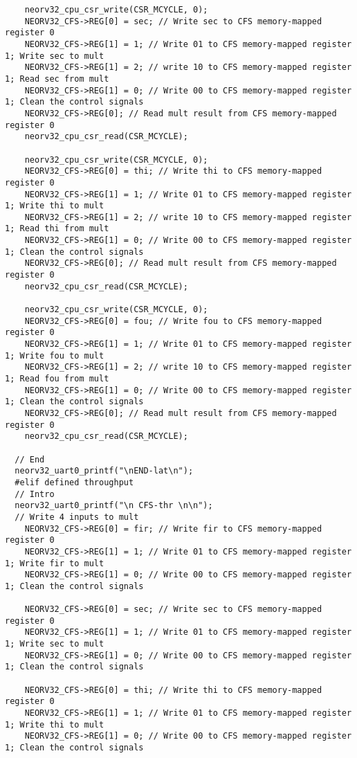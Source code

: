 \begin{code}
\begin{verbatim}
    neorv32_cpu_csr_write(CSR_MCYCLE, 0);
    NEORV32_CFS->REG[0] = sec; // Write sec to CFS memory-mapped register 0
    NEORV32_CFS->REG[1] = 1; // Write 01 to CFS memory-mapped register 1; Write sec to mult
    NEORV32_CFS->REG[1] = 2; // write 10 to CFS memory-mapped register 1; Read sec from mult
    NEORV32_CFS->REG[1] = 0; // Write 00 to CFS memory-mapped register 1; Clean the control signals
    NEORV32_CFS->REG[0]; // Read mult result from CFS memory-mapped register 0  
    neorv32_cpu_csr_read(CSR_MCYCLE); 

    neorv32_cpu_csr_write(CSR_MCYCLE, 0);
    NEORV32_CFS->REG[0] = thi; // Write thi to CFS memory-mapped register 0
    NEORV32_CFS->REG[1] = 1; // Write 01 to CFS memory-mapped register 1; Write thi to mult
    NEORV32_CFS->REG[1] = 2; // write 10 to CFS memory-mapped register 1; Read thi from mult
    NEORV32_CFS->REG[1] = 0; // Write 00 to CFS memory-mapped register 1; Clean the control signals
    NEORV32_CFS->REG[0]; // Read mult result from CFS memory-mapped register 0  
    neorv32_cpu_csr_read(CSR_MCYCLE); 

    neorv32_cpu_csr_write(CSR_MCYCLE, 0);
    NEORV32_CFS->REG[0] = fou; // Write fou to CFS memory-mapped register 0
    NEORV32_CFS->REG[1] = 1; // Write 01 to CFS memory-mapped register 1; Write fou to mult
    NEORV32_CFS->REG[1] = 2; // write 10 to CFS memory-mapped register 1; Read fou from mult
    NEORV32_CFS->REG[1] = 0; // Write 00 to CFS memory-mapped register 1; Clean the control signals
    NEORV32_CFS->REG[0]; // Read mult result from CFS memory-mapped register 0  
    neorv32_cpu_csr_read(CSR_MCYCLE); 

  // End
  neorv32_uart0_printf("\nEND-lat\n");
  #elif defined throughput
  // Intro
  neorv32_uart0_printf("\n CFS-thr \n\n");
  // Write 4 inputs to mult
    NEORV32_CFS->REG[0] = fir; // Write fir to CFS memory-mapped register 0
    NEORV32_CFS->REG[1] = 1; // Write 01 to CFS memory-mapped register 1; Write fir to mult
    NEORV32_CFS->REG[1] = 0; // Write 00 to CFS memory-mapped register 1; Clean the control signals

    NEORV32_CFS->REG[0] = sec; // Write sec to CFS memory-mapped register 0
    NEORV32_CFS->REG[1] = 1; // Write 01 to CFS memory-mapped register 1; Write sec to mult
    NEORV32_CFS->REG[1] = 0; // Write 00 to CFS memory-mapped register 1; Clean the control signals

    NEORV32_CFS->REG[0] = thi; // Write thi to CFS memory-mapped register 0
    NEORV32_CFS->REG[1] = 1; // Write 01 to CFS memory-mapped register 1; Write thi to mult
    NEORV32_CFS->REG[1] = 0; // Write 00 to CFS memory-mapped register 1; Clean the control signals


\end{verbatim}
\end{code}

